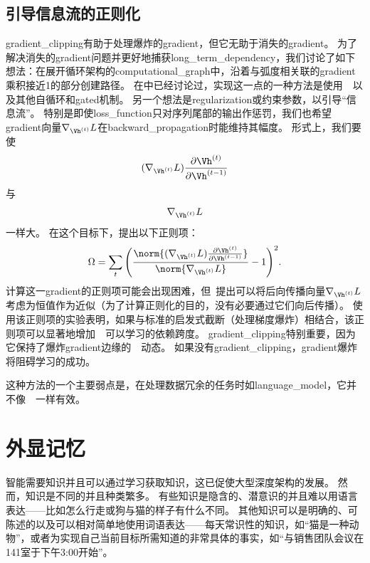 \subsection{引导信息流的正则化}
\label{sec:regularizing_to_encourage_information_flow}
\gls{gradient_clipping}有助于处理爆炸的\gls{gradient}，但它无助于消失的\gls{gradient}。
为了解决消失的\gls{gradient}问题并更好地捕获\gls{long_term_dependency}，我们讨论了如下想法：在展开循环架构的\gls{computational_graph}中，沿着与弧度相关联的\gls{gradient}乘积接近1的部分创建路径。
在中已经讨论过，实现这一点的一种方法是使用~~以及其他自循环和\gls{gated}机制。
另一个想法是\gls{regularization}或约束参数，以引导``信息流''。
特别是即使\gls{loss_function}只对序列尾部的输出作惩罚，我们也希望\gls{gradient}向量$\nabla_{\Vh^{(t)}} L$在\gls{backward_propagation}时能维持其幅度。
形式上，我们要使
\begin{align}
 (\nabla_{\Vh^{(t)}} L) \frac{\partial \Vh^{(t)}}{\partial \Vh^{(t-1)}}
\end{align}
与
\begin{align}
\nabla_{\Vh^{(t)}} L 
\end{align}
一样大。
在这个目标下，\citet{Pascanu+al-ICML2013-small}提出以下正则项：
\begin{align}
 \Omega = \sum_t \Bigg(  \frac{
 \norm{ (\nabla_{\Vh^{(t)}} L) \frac{\partial \Vh^{(t)}}{\partial \Vh^{(t-1)}}}}
 {\norm{\nabla_{\Vh^{(t)}} L}} -1 \Bigg)^2.
\end{align}
计算这一\gls{gradient}的正则项可能会出现困难，但~\cite{Pascanu+al-ICML2013-small}提出可以将后向传播向量$\nabla_{\Vh^{(t)}} L$考虑为恒值作为近似（为了计算正则化的目的，没有必要通过它们向后传播）。
使用该正则项的实验表明，如果与标准的启发式截断（处理梯度爆炸）相结合，该正则项可以显著地增加~~可以学习的依赖跨度。
\gls{gradient_clipping}特别重要，因为它保持了爆炸\gls{gradient}边缘的~~动态。
如果没有\gls{gradient_clipping}，\gls{gradient}爆炸将阻碍学习的成功。

这种方法的一个主要弱点是，在处理数据冗余的任务时如\gls{language_model}，它并不像~~一样有效。


\section{外显记忆}
\label{sec:explicit_memory}
智能需要知识并且可以通过学习获取知识，这已促使大型深度架构的发展。
然而，知识是不同的并且种类繁多。
有些知识是隐含的、潜意识的并且难以用语言表达——比如怎么行走或狗与猫的样子有什么不同。
其他知识可以是明确的、可陈述的以及可以相对简单地使用词语表达——每天常识性的知识，如``猫是一种动物''，或者为实现自己当前目标所需知道的非常具体的事实，如``与销售团队会议在141室于下午3:00开始''。


